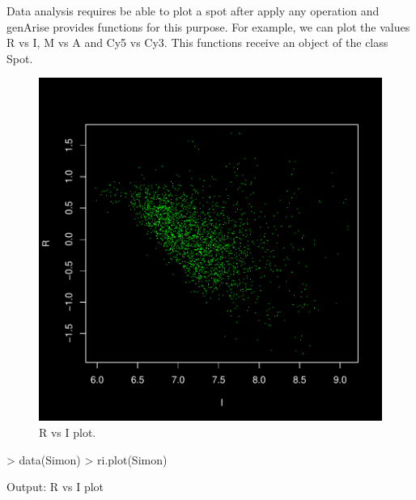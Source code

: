 \documentclass[12pt]{article}
\begin{document}
Data analysis requires be able to plot a spot after apply any operation and genArise provides functions for this purpose. For example, we can plot the values R vs I, M vs A and Cy5 vs Cy3. This functions receive an object of the class Spot.
\begin{figure}[h]
\begin{center}
\includegraphics{example-genArise-006}
\caption{R vs I plot. \label{fig4}}	
\end{center}
\end{figure}
\begin{Scode}
> data(Simon)
> ri.plot(Simon)
\end{Scode}
\begin{Soutput}
Output: R vs I plot 
\end{Soutput}
\pagebreak
\end{document}
